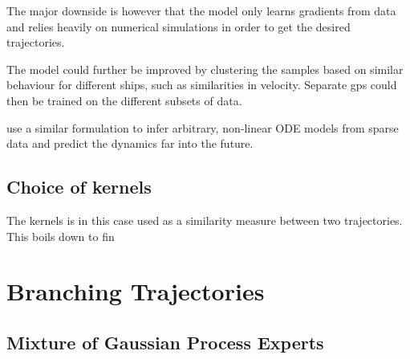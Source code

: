 The major downside is however that the model only learns gradients from data and relies heavily on numerical simulations in order to get the desired trajectories.

The model could further be improved by clustering the samples based on similar behaviour for different ships, such as similarities in velocity. Separate \acrshort{gp}s could then be trained on the different subsets of data.

\cite{heinonen2018learningode} use a similar formulation to infer arbitrary, non-linear ODE models from sparse data and predict the dynamics far into the future. 


\subsection{Choice of kernels}
The kernels is in this case used as a similarity measure between two trajectories. This boils down to fin




\section{Branching Trajectories}


\subsection{Mixture of Gaussian Process Experts}

